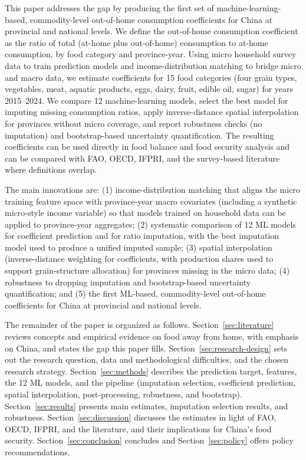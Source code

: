 \documentclass[12pt,a4paper]{article}
\begin{document}
This paper addresses the gap by producing the first set of machine-learning-based, commodity-level out-of-home consumption coefficients for China at provincial and national levels. We define the out-of-home consumption coefficient as the ratio of total (at-home plus out-of-home) consumption to at-home consumption, by food category and province-year. Using micro household survey data to train prediction models and income-distribution matching to bridge micro and macro data, we estimate coefficients for 15 food categories (four grain types, vegetables, meat, aquatic products, eggs, dairy, fruit, edible oil, sugar) for years 2015--2024. We compare 12 machine-learning models, select the best model for imputing missing consumption ratios, apply inverse-distance spatial interpolation for provinces without micro coverage, and report robustness checks (no imputation) and bootstrap-based uncertainty quantification. The resulting coefficients can be used directly in food balance and food security analysis and can be compared with FAO, OECD, IFPRI, and the survey-based literature where definitions overlap.

The main innovations are: (1) income-distribution matching that aligns the micro training feature space with province-year macro covariates (including a synthetic micro-style income variable) so that models trained on household data can be applied to province-year aggregates; (2) systematic comparison of 12 ML models for coefficient prediction and for ratio imputation, with the best imputation model used to produce a unified imputed sample; (3) spatial interpolation (inverse-distance weighting for coefficients, with production shares used to support grain-structure allocation) for provinces missing in the micro data; (4) robustness to dropping imputation and bootstrap-based uncertainty quantification; and (5) the first ML-based, commodity-level out-of-home coefficients for China at provincial and national levels.

The remainder of the paper is organized as follows. Section~\ref{sec:literature} reviews concepts and empirical evidence on food away from home, with emphasis on China, and states the gap this paper fills. Section~\ref{sec:research-design} sets out the research question, data and methodological difficulties, and the chosen research strategy. Section~\ref{sec:methods} describes the prediction target, features, the 12 ML models, and the pipeline (imputation selection, coefficient prediction, spatial interpolation, post-processing, robustness, and bootstrap). Section~\ref{sec:results} presents main estimates, imputation selection results, and robustness. Section~\ref{sec:discussion} discusses the estimates in light of FAO, OECD, IFPRI, and the literature, and their implications for China's food security. Section~\ref{sec:conclusion} concludes and Section~\ref{sec:policy} offers policy recommendations.
\end{document}
